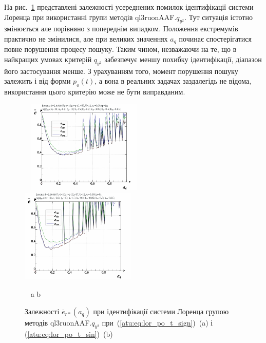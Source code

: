 На рис.~\ref{atu:f:lor_a_q_ql3ruonAAF.q_y2} представлені залежності усереднених
помилок ідентифікації системи Лоренца при використанні групи методів ql3ruonAAF.$q_{y^2}$.
Тут ситуація істотно змінюється але порівняно з
попереднім випадком. Положення екстремумів практично не
змінилися, але при великих значеннях
$ a_q $ починає спостерігатися повне порушення процесу
пошуку. Таким чином, незважаючи на те, що в найкращих умовах
критерій
$ q_{y^2} $ забезпечує меншу похибку ідентифікації, діапазон його
застосування менше. З урахуванням того, момент порушення пошуку
залежить і від форми
$ p_o (t) $, а вона в реальних задачах заздалегідь не відома,
використання цього критерію може не бути виправданим.

\begin{figure}[ht!]
  \begin{center}
    ~ \hfill
    \includegraphics[width=0.49\textwidth]{p/cha/lor/ql3ruonAAF/lor_ql3ruonAAF_qy2-p_a_q_e_sign.png}
    \hfill
    \includegraphics[width=0.49\textwidth]{p/cha/lor/ql3ruonAAF/lor_ql3ruonAAF_qy2-p_a_q_e_sin.png}
    \hfill ~
  \end{center}
  \vspace{-1.0ex}
  \begin{center}
    ~ \hfill a \hfill\hfill b \hfill ~
  \end{center}
  \vspace{-1.5ex}
  \caption{Залежності $ \overline{e}_{r *} (a_q) $ при ідентифікації системи Лоренца групою методів ql3ruonAAF.$q_{y^2} $ при~(\ref{atu:eq:lor_po_t_sign})~(a) і (\ref{atu:eq:lor_po_t_sin})~(b)}
  \label{atu:f:lor_a_q_ql3ruonAAF.q_y2}
\end{figure}


